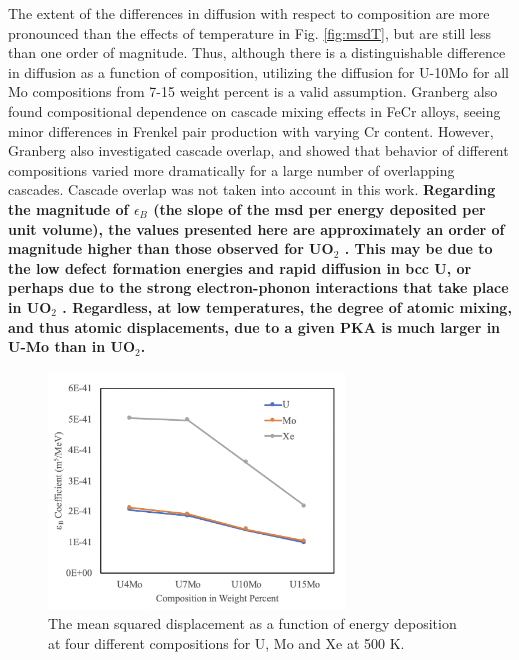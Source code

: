 \documentclass[review]{elsarticle}
\providecommand{\DIFaddtex}[1]{{\bf #1}} %
\providecommand{\DIFaddbegin}{\protect\color{blue}} %
\providecommand{\DIFaddend}{\protect\color{black}} %
\providecommand{\DIFaddbeginFL}{} %
\providecommand{\DIFaddendFL}{} %
\providecommand{\DIFdelbeginFL}{} %
\providecommand{\DIFdelendFL}{} %
\providecommand{\DIFadd}[1]{\texorpdfstring{\DIFaddtex{#1}}{#1}} %
\newcommand{\DIFscaledelfig}{0.5}
\newlength{\DIFdelgraphicswidth} %
\newlength{\DIFdelgraphicsheight} %
\newcommand{\DIFaddincludegraphics}[2][]{{\color{blue}\fbox{\DIFOincludegraphics[#1]{#2}}}} %
\newcommand{\DIFdelincludegraphics}[2][]{%
\sbox{\DIFdelgraphicsbox}{\DIFOincludegraphics[#1]{#2}}%
\settoboxwidth{\DIFdelgraphicswidth}{\DIFdelgraphicsbox} %
\settoboxtotalheight{\DIFdelgraphicsheight}{\DIFdelgraphicsbox} %
\scalebox{\DIFscaledelfig}{%
\parbox[b]{\DIFdelgraphicswidth}{\usebox{\DIFdelgraphicsbox}\\[-\baselineskip] \rule{\DIFdelgraphicswidth}{0em}}\llap{\resizebox{\DIFdelgraphicswidth}{\DIFdelgraphicsheight}{%
\setlength{\unitlength}{\DIFdelgraphicswidth}%
\begin{picture}(1,1)%
\thicklines\linethickness{2pt} %
{\color[rgb]{1,0,0}\put(0,0){\framebox(1,1){}}}%
{\color[rgb]{1,0,0}\put(0,0){\line( 1,1){1}}}%
{\color[rgb]{1,0,0}\put(0,1){\line(1,-1){1}}}%
\end{picture}%
}\hspace*{3pt}}} %
} %
\DeclareRobustCommand{\DIFaddbegin}{\DIFOaddbegin \let\includegraphics\DIFaddincludegraphics} %
\DeclareRobustCommand{\DIFaddend}{\DIFOaddend \let\includegraphics\DIFOincludegraphics} %
\DeclareRobustCommand{\DIFaddbeginFL}{\DIFOaddbeginFL \let\includegraphics\DIFaddincludegraphics} %
\DeclareRobustCommand{\DIFaddendFL}{\DIFOaddendFL \let\includegraphics\DIFOincludegraphics} %
\DeclareRobustCommand{\DIFdelbeginFL}{\DIFOdelbeginFL \let\includegraphics\DIFdelincludegraphics} %
\DeclareRobustCommand{\DIFdelendFL}{\DIFOaddendFL \let\includegraphics\DIFOincludegraphics} %
\begin{document}
\DIFaddend The extent of the differences in diffusion with respect to composition are more pronounced than the effects of temperature in Fig. \ref{fig:msdT}, but are still less than one order of magnitude. Thus, although there is a distinguishable difference in diffusion as a function of composition, utilizing the diffusion for U-10Mo for all Mo compositions from 7-15 weight percent is a valid assumption. Granberg \cite{granberg2020} also found compositional dependence on cascade mixing effects in FeCr alloys, seeing minor differences in Frenkel pair production with varying Cr content. However, Granberg also investigated cascade overlap, and showed that behavior of different compositions varied more dramatically for a large number of overlapping cascades. Cascade overlap was not taken into account in this work. \DIFaddbegin \DIFadd{Regarding the magnitude of $\epsilon_B$ (the slope of the msd per energy deposited per unit volume), the values presented here are approximately an order of magnitude higher than those observed for UO$_2$ \cite{cooper2016,matthews_cluster_2019, perriot_atomistic_2019, wormald2015, martin2009}. This may be due to the low defect formation energies \cite{beeler2010} and rapid diffusion \cite{smirnovaADP} in bcc U, or perhaps due to the strong electron-phonon interactions that take place in UO$_2$ \cite{wormald2015}. Regardless, at low temperatures, the degree of atomic mixing, and thus atomic displacements, due to a given PKA is much larger in U-Mo than in UO$_2$. 
}\DIFaddend 

\begin{figure}[h]
 \centering
 \DIFdelbeginFL %
\DIFdelendFL \DIFaddbeginFL \includegraphics[width=0.7\textwidth]{7_epsB_comp.png} 
 \DIFaddendFL \caption{The mean squared displacement as a function of energy deposition at four different compositions for U, Mo and Xe at 500 K.}
 \DIFdelbeginFL %
\DIFdelendFL \DIFaddbeginFL \label{fig:epsB_comp}
\DIFaddendFL \end{figure}
\end{document}
